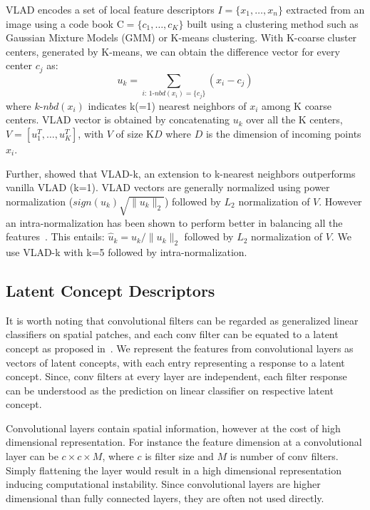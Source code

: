VLAD encodes a set of local feature descriptors $I=\{x_1,\ldots,x_n\}$ extracted from an image using a code book $\mathrm{C} = \{c_1, \ldots, c_K \}$ built using a clustering method such as Gaussian Mixture Models (GMM) or K-means clustering. With K-coarse cluster centers, generated by K-means, we can obtain the difference vector for every center $c_j$ as:
\[ u_k = \sum_{i:\,1\text{-}nbd(x_i)=\{c_j\}} (x_i- c_j)
\]
where $k\text{-}nbd(x_i)$ indicates k(=1) nearest neighbors of $x_i$ among K coarse centers.
VLAD vector is obtained by concatenating $u_k$ over all the K centers, $V = [u_1^T, \ldots, u_K^T]$, with $V$ of size K$D$ where $D$ is the dimension of incoming points $x_i$. 

Further, \cite{kantorov2014efficient} showed that VLAD-k, an extension to k-nearest neighbors outperforms vanilla VLAD (k=1). VLAD vectors are generally normalized using power normalization ($sign(u_k)\sqrt{\|u_k\|_2}$) followed by $L_2$ normalization of $V$. However an intra-normalization has been shown to perform better in balancing all the features~\cite{arandjelovic2013all}. This entails: $\hat{u}_k = u_k/\|u_k\|_2$ followed by $L_2$ normalization of $V$.
We use VLAD-k with k=5 followed by intra-normalization.

\subsection*{Latent Concept Descriptors}

It is worth noting that convolutional filters can be regarded as generalized linear classifiers on spatial patches, and each conv filter can be equated to a latent concept as proposed in~\cite{xu2014discriminative}. We represent the features from convolutional layers as vectors of latent concepts, with each entry representing a response to a latent concept. Since, conv filters at every layer are independent, each filter response can be understood as the prediction on linear classifier on respective latent concept.

Convolutional layers contain spatial information, however at the cost of high dimensional representation. For instance the feature dimension at a convolutional layer can be $c\times c \times M$, where $c$ is filter size and $M$ is number of conv filters. Simply flattening the layer would result in a high dimensional representation inducing computational instability. Since convolutional layers are higher dimensional than fully connected layers, they are often not used directly.

